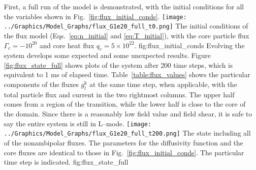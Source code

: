 First, a full run of the model is demonstrated, with the initial conditions for all the variables shown in Fig.~\ref{fig:flux_initial_conds}.
	{\texttt{[image: ../Graphics/Model\_Graphs/flux\_G1e20\_full\_t0.png]}}
	{The initial conditions of the flux model (Eqs.~\ref{eq:n_initial} and \ref{eq:T_initial}), with the core particle flux $\Gamma_c = -10^{20}$ and core heat flux $q_c = 5\times 10^{22}$.}
	{fig:flux_initial_conds}
Evolving the system develops some expected and some unexpected results.
Figure \ref{fig:flux_state_full} shows plots of the system after 200 time steps, which is equivalent to 1 ms of elapsed time.
Table~\ref{table:flux_values} shows the particular components of the fluxes $g_l^\text{k}$ at the same time step, when applicable, with the total particle flux and current in the two rightmost columns.
The upper half comes from a region of the transition, while the lower half is close to the core of the domain.
Since there is a reasonably low field value and field shear, it is safe to say the entire system is still in L--mode.
	{\texttt{[image: ../Graphics/Model\_Graphs/flux\_G1e20\_full\_t200.png]}}
	{The state including all of the nonambipolar fluxes.
	The parameters for the diffusivity function and the core fluxes are identical to those in Fig.~\ref{fig:flux_initial_conds}.
	The particular time step is indicated.}
	{fig:flux_state_full}

